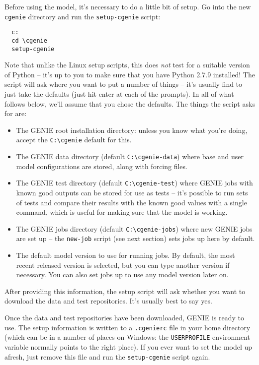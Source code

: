 \documentclass[a4paper,10pt,article]{memoir}
\begin{document}
Before using the model, it's necessary to do a little bit of setup.
Go into the new \texttt{cgenie} directory and run the
\texttt{setup-cgenie} script:
\begin{verbatim}
  c:
  cd \cgenie
  setup-cgenie
\end{verbatim}
Note that unlike the Linux setup scripts, this does \emph{not} test
for a suitable version of Python -- it's up to you to make sure that
you have Python 2.7.9 installed!  The script will ask where you want
to put a number of things -- it's usually find to just take the
defaults (just hit enter at each of the prompts).  In all of what
follows below, we'll assume that you chose the defaults.  The things
the script asks for are:
\begin{itemize}
  \item{The GENIE root installation directory: unless you know what
    you're doing, accept the \texttt{C:\textbackslash{}cgenie} default
    for this.}
  \item{The GENIE data directory (default
    \texttt{C:\textbackslash{}cgenie-data}) where base and user model
    configurations are stored, along with forcing files.}
  \item{The GENIE test directory (default
    \texttt{C:\textbackslash{}cgenie-test}) where GENIE jobs with
    known good outputs can be stored for use as tests -- it's possible
    to run sets of tests and compare their results with the known good
    values with a single command, which is useful for making sure that
    the model is working.}
  \item{The GENIE jobs directory (default
    \texttt{C:\textbackslash{}cgenie-jobs}) where new GENIE jobs are
    set up -- the \texttt{new-job} script (see next section) sets jobs
    up here by default.}
  \item{The default model version to use for running jobs.  By
    default, the most recent released version is selected, but you can
    type another version if necessary.  You can also set jobs up to
    use any model version later on.}
\end{itemize}
After providing this information, the setup script will ask whether
you want to download the data and test repositories.  It's usually
best to say yes.

Once the data and test repositories have been downloaded, GENIE is
ready to use.  The setup information is written to a
\texttt{.cgenierc} file in your home directory (which can be in a
number of places on Windows: the \texttt{USERPROFILE} environment
variable normally points to the right place).  If you ever want to set
the model up afresh, just remove this file and run the
\texttt{setup-cgenie} script again.
\end{document}
